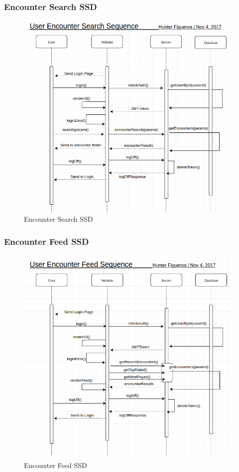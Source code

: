\documentclass[12pt,a4paper]{report}
\begin{document}
	\subsubsection {Encounter Search SSD}
		\begin{figure}[H]
			\centering
			\centerline{\includegraphics[scale=.75, angle=90]{ssd_encounter_search}}
			\caption{Encounter Search SSD}
			\label{fig: Encounter Search SSD }
		\end{figure}
	
	\newpage
	\subsubsection {Encounter Feed SSD}
		\begin{figure}[H]
			\centering
			\centerline{\includegraphics[scale=.75, angle=90]{ssd_encounter_feed}}
			\caption{Encounter Feed SSD}
			\label{fig: Encountner Feed SSD }
		\end{figure}
	
\end{document}
